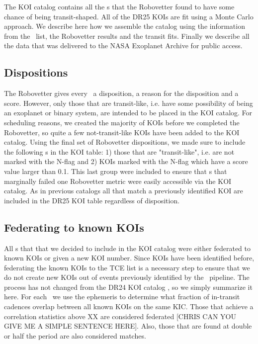 The KOI catalog contains all the \opstce s that the Robovetter found to have some chance of being transit-shaped. All of the DR25 KOIs are fit using a Monte Carlo approach. We describe here how we assemble the catalog using the information from the \opstce\ list, the Robovetter results and the transit fits. Finally we describe all the data that was delivered to the NASA Exoplanet Archive for public access.
\label{koisec}

\subsection{Dispositions}
The Robovetter gives every \opstce\ a disposition, a reason for the disposition and a score.  However, only those that are transit-like, i.e. have some possibility of being an exoplanet or binary system, are intended to be placed in the KOI catalog. For scheduling reasons, we created the majority of KOIs before we completed the Robovetter, so quite a few not-transit-like KOIs have been added to the KOI catalog. Using the final set of Robovetter dispositions, we made sure to include the following \opstce s in the KOI table: 1) those that are "transit-like", i.e. are not marked with the N-flag and 2) KOIs marked with the N-flag which have a score value larger than 0.1.  This last group were included to ensure that \opstce s that marginally failed one Robovetter metric were easily accessible via the KOI catalog. As in previous catalogs all  that match a previously identified KOI are included in the DR25 KOI table regardless of disposition.


\subsection{Federating to known KOIs}
All \opstce s that that we decided to include in the KOI catalog were either federated to known KOIs or given a new KOI number. Since KOIs have been identified before, federating the known KOIs to the TCE list is a necessary step to ensure that we do not create new KOIs out of events previously identified by the \Kepler\ pipeline.  The process has not changed from the  DR24 KOI catalog \citep{Coughlin2016}, so we simply summarize it here.  For each \opstce\ we use the ephemeris to determine what fraction of in-transit cadences overlap between all known KOIs on the same KIC.  Those that achieve a correlation statistics above XX are considered federated [CHRIS CAN YOU GIVE ME A SIMPLE SENTENCE HERE].  Also, those that are found at double or half the period are also considered matches.  

